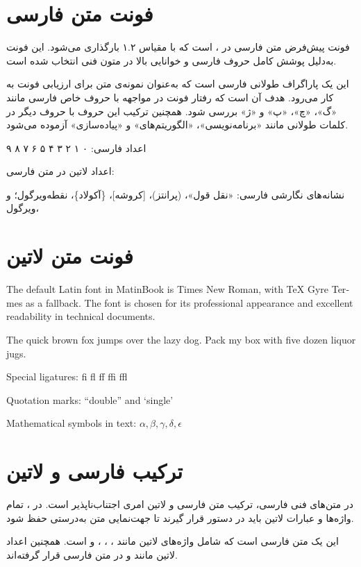 \documentclass{matinbook}
\begin{document}
\section{فونت متن فارسی}
\label{sec:font-persian}

فونت پیش‌فرض متن فارسی در ،  است
که با مقیاس ۱.۲ بارگذاری می‌شود. این فونت به‌دلیل پوشش کامل
حروف فارسی و خوانایی بالا در متون فنی انتخاب شده است.

این یک پاراگراف طولانی فارسی است که به‌عنوان نمونه‌ی متن
برای ارزیابی فونت به کار می‌رود. هدف آن است که رفتار فونت
در مواجهه با حروف خاص فارسی مانند «گ»، «چ»، «پ» و «ژ» بررسی شود.
همچنین ترکیب این حروف با حروف دیگر در کلمات طولانی مانند
«برنامه‌نویسی»، «الگوریتم‌های» و «پیاده‌سازی» آزموده می‌شود.

اعداد فارسی: ۰ ۱ ۲ ۳ ۴ ۵ ۶ ۷ ۸ ۹

اعداد لاتین در متن فارسی: 

نشانه‌های نگارشی فارسی: «نقل قول»، (پرانتز)، [کروشه]، \{آکولاد\}،
نقطه‌ویرگول؛ و ویرگول،

\section{فونت متن لاتین}
\label{sec:font-latin}

\begin{latin}
The default Latin font in MatinBook is Times New Roman, with
TeX Gyre Termes as a fallback. The font is chosen for its
professional appearance and excellent readability in technical
documents.

The quick brown fox jumps over the lazy dog.
Pack my box with five dozen liquor jugs.

Special ligatures: fi fl ff ffi ffl

Quotation marks: ``double'' and `single'

Mathematical symbols in text: \(\alpha, \beta, \gamma, \delta, \epsilon\)
\end{latin}

\section{ترکیب فارسی و لاتین}
\label{sec:font-mixing}

در متن‌های فنی فارسی، ترکیب متن فارسی و لاتین امری اجتناب‌ناپذیر
است. در ، تمام واژه‌ها و عبارات لاتین باید در
دستور  قرار گیرند تا جهت‌نمایی
متن به‌درستی حفظ شود.

این یک متن فارسی است که شامل واژه‌های لاتین مانند ،
، ،  و  است.
همچنین اعداد لاتین مانند  و  در متن فارسی
قرار گرفته‌اند.
\end{document}
